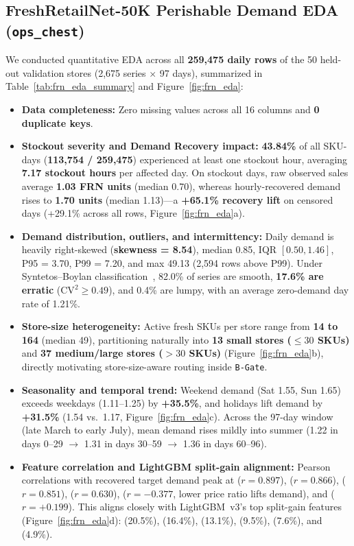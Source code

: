 \subsection*{FreshRetailNet-50K Perishable Demand EDA (\texttt{ops\_chest})}
We conducted quantitative EDA across all \textbf{259,475 daily rows} of the 50 held-out validation stores (2,675 series $\times$ 97 days), summarized in Table~\ref{tab:frn_eda_summary} and Figure~\ref{fig:frn_eda}:
\begin{itemize}
    \item \textbf{Data completeness:} Zero missing values across all 16 columns and \textbf{0 duplicate  keys}.
    \item \textbf{Stockout severity and Demand Recovery impact:} \textbf{43.84\%} of all SKU-days (\textbf{113,754 / 259,475}) experienced at least one stockout hour, averaging \textbf{7.17 stockout hours} per affected day. On stockout days, raw observed sales average \textbf{1.03 FRN units} (median 0.70), whereas hourly-recovered demand rises to \textbf{1.70 units} (median 1.13)---a \textbf{+65.1\% recovery lift} on censored days (+29.1\% across all rows, Figure~\ref{fig:frn_eda}a).
    \item \textbf{Demand distribution, outliers, and intermittency:} Daily demand is heavily right-skewed (\textbf{skewness = 8.54}), median 0.85, IQR $[0.50, 1.46]$, P95 = 3.70, P99 = 7.20, and max 49.13 (2,594 rows above P99). Under Syntetos--Boylan classification~\cite{syntetos2005intermittent}, 82.0\% of series are smooth, \textbf{17.6\% are erratic} ($\text{CV}^2 \ge 0.49$), and 0.4\% are lumpy, with an average zero-demand day rate of 1.21\%.
    \item \textbf{Store-size heterogeneity:} Active fresh SKUs per store range from \textbf{14 to 164} (median 49), partitioning naturally into \textbf{13 small stores ($\le 30$ SKUs)} and \textbf{37 medium/large stores ($> 30$ SKUs)} (Figure~\ref{fig:frn_eda}b), directly motivating store-size-aware routing inside \texttt{B-Gate}.
    \item \textbf{Seasonality and temporal trend:} Weekend demand (Sat 1.55, Sun 1.65) exceeds weekdays (1.11--1.25) by \textbf{+35.5\%}, and holidays lift demand by \textbf{+31.5\%} (1.54 vs.\ 1.17, Figure~\ref{fig:frn_eda}c). Across the 97-day window (late March to early July), mean demand rises mildly into summer (1.22 in days 0--29 $\to$ 1.31 in days 30--59 $\to$ 1.36 in days 60--96).
    \item \textbf{Feature correlation and LightGBM split-gain alignment:} Pearson correlations with recovered target demand peak at  ($r=0.897$),  ($r=0.866$),  ($r=0.851$),  ($r=0.630$),  ($r=-0.377$, lower price ratio lifts demand), and  ($r=+0.199$). This aligns closely with LightGBM~v3's top split-gain features (Figure~\ref{fig:frn_eda}d):  (20.5\%),  (16.4\%),  (13.1\%),  (9.5\%),  (7.6\%), and  (4.9\%).
\end{itemize}

